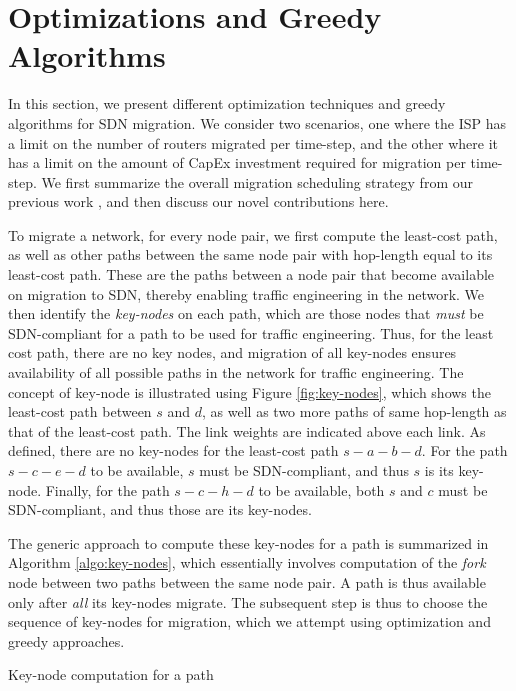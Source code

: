 \documentclass[conference]{IEEEtran}
\begin{document}
\section{Optimizations and Greedy Algorithms}\label{sec:migration-model}
In this section, we present different optimization techniques and greedy
algorithms for SDN migration. We consider two scenarios, one where
the ISP has a limit on the number of routers migrated per
time-step, and the other where it has a limit on the amount of CapEx investment
required for migration per time-step. We first summarize the overall migration
scheduling strategy from our previous work \cite{caria-sdn-migration}, and then
discuss our novel contributions here. 

\par To migrate a network, for every node pair, we first compute the least-cost
path, as well as other paths between the same node pair with hop-length equal to
its least-cost path. These are the paths between a node pair that become
available on migration to SDN, thereby enabling traffic engineering in the
network. We then identify the \emph{key-nodes} on each path, which are those
nodes that \emph{must} be SDN-compliant for a path to be used for traffic
engineering. Thus, for the least cost path, there are no key nodes, and
migration of all key-nodes ensures availability of all possible paths in the
network for traffic engineering. The concept of key-node is illustrated using
Figure \ref{fig:key-nodes}, which shows the least-cost path between $s$ and $d$,
as well as two more paths of same hop-length as that of the least-cost path. The
link weights are indicated above each link. As defined, there are no key-nodes
for the least-cost path $s-a-b-d$.
For the path $s-c-e-d$ to be available, $s$ must be SDN-compliant, and thus $s$
is its key-node. Finally, for the path $s-c-h-d$ to be
available, both $s$ and $c$ must be SDN-compliant, and thus those are its
key-nodes.

\par The generic approach to compute these key-nodes for a path is summarized in
Algorithm \ref{algo:key-nodes}, which essentially involves computation of the
\emph{fork} node between two paths between the same node pair. A path is thus
available only after \emph{all} its key-nodes migrate. The subsequent step is thus to choose the
sequence of key-nodes for migration, which we attempt using optimization and
greedy approaches. 

\begin{algorithm}[b]
\caption{Key-node computation for a path} \label{algo:key-nodes}
\begin{algorithmic}
\ENDFOR
{}
\end{algorithmic}
\end{algorithm}
\end{document}

